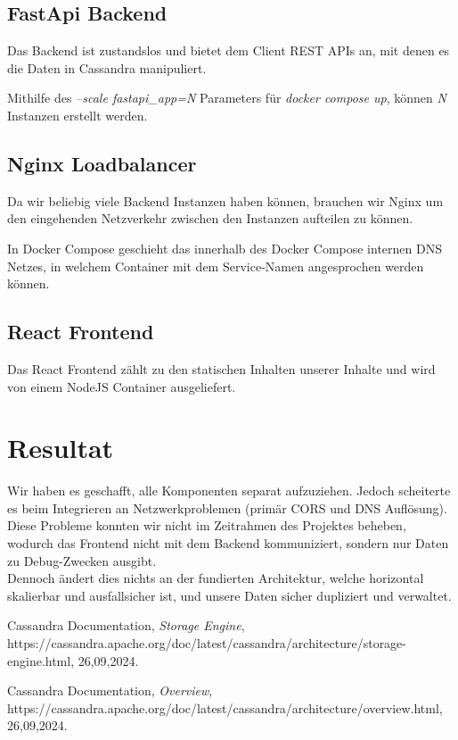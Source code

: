 \documentclass{article}  %
\begin{document}
\subsection{FastApi Backend}
Das Backend ist zustandslos und bietet dem Client REST APIs an, mit denen es die Daten in Cassandra manipuliert.

Mithilfe des \textit{--scale fastapi{\_}app=N} Parameters für \textit{docker compose up}, können \textit{N} Instanzen erstellt werden.

\subsection{Nginx Loadbalancer}
Da wir beliebig viele Backend Instanzen haben können, brauchen wir Nginx um den eingehenden Netzverkehr zwischen den Instanzen aufteilen zu können.

In Docker Compose geschieht das innerhalb des Docker Compose internen DNS Netzes, in welchem Container mit dem Service-Namen angesprochen werden können.


\subsection{React Frontend}

Das React Frontend zählt zu den statischen Inhalten unserer Inhalte und wird von einem NodeJS Container ausgeliefert.
\newpage

\section{Resultat}
Wir haben es geschafft, alle Komponenten separat aufzuziehen. Jedoch scheiterte es beim Integrieren an Netzwerkproblemen (primär CORS und DNS Auflösung). 
Diese Probleme konnten wir nicht im Zeitrahmen des Projektes beheben, wodurch das Frontend nicht mit dem Backend kommuniziert, sondern nur Daten zu Debug-Zwecken ausgibt.\\

Dennoch ändert dies nichts an der fundierten Architektur, welche horizontal skalierbar und ausfallsicher ist, und unsere Daten sicher dupliziert und verwaltet.

\newpage
\begin{thebibliography}{20} %
    Cassandra Documentation, \textit{Storage Engine}, https://cassandra.apache.org/doc/latest/cassandra/architecture/storage-engine.html, 26,09,2024.

    Cassandra Documentation, \textit{Overview}, https://cassandra.apache.org/doc/latest/cassandra/architecture/overview.html, 26,09,2024.

    
\end{thebibliography}
\end{document}
